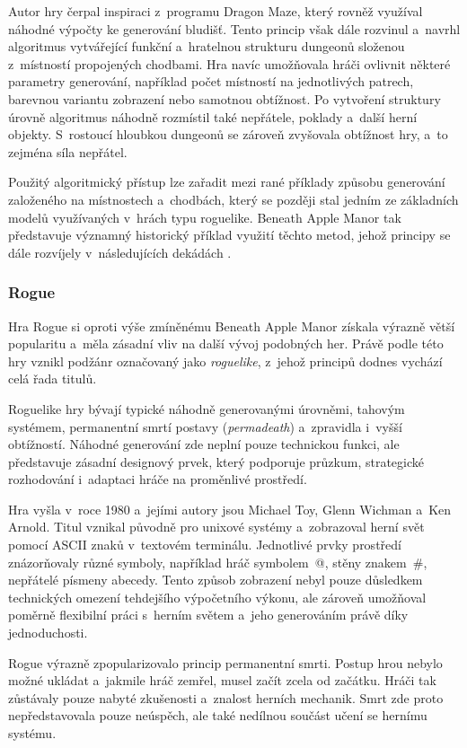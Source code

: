 \documentclass[
   program=itk,
   biblatex,
   figures=true,
   tables=true,
   glossaries,
   index
]{kidiplom}
\begin{document}
Autor hry čerpal inspiraci z~programu Dragon Maze, který rovněž využíval náhodné výpočty ke generování bludišť. Tento princip však dále rozvinul a~navrhl algoritmus vytvářející funkční a~hratelnou strukturu dungeonů složenou z~místností propojených chodbami. Hra navíc umožňovala hráči ovlivnit některé parametry generování, například počet místností na jednotlivých patrech, barevnou variantu zobrazení nebo samotnou obtížnost. Po vytvoření struktury úrovně algoritmus náhodně rozmístil také nepřátele, poklady a~další herní objekty. S~rostoucí hloubkou dungeonů se zároveň zvyšovala obtížnost hry, a~to zejména síla nepřátel.

Použitý algoritmický přístup lze zařadit mezi rané příklady způsobu generování založeného na místnostech a~chodbách, který se později stal jedním ze základních modelů využívaných v~hrách typu roguelike. Beneath Apple Manor tak představuje významný historický příklad využití těchto metod, jehož principy se dále rozvíjely v~následujících dekádách \cite{Schuller_2021,enwiki:1260179812}.

\subsubsection{Rogue}
Hra Rogue si oproti výše zmíněnému Beneath Apple Manor získala výrazně větší popularitu a~měla zásadní vliv na další vývoj podobných her. Právě podle této hry vznikl podžánr označovaný jako \textit{roguelike}, z~jehož principů dodnes vychází celá řada titulů.

Roguelike hry bývají typické náhodně generovanými úrovněmi, tahovým systémem, permanentní smrtí postavy (\textit{permadeath}) a~zpravidla i~vyšší obtížností. Náhodné generování zde neplní pouze technickou funkci, ale představuje zásadní designový prvek, který podporuje průzkum, strategické rozhodování i~adaptaci hráče na proměnlivé prostředí.

Hra vyšla v~roce 1980 a~jejími autory jsou Michael Toy, Glenn Wichman a~Ken Arnold. Titul vznikal původně pro unixové systémy a~zobrazoval herní svět pomocí ASCII znaků v~textovém terminálu. Jednotlivé prvky prostředí znázorňovaly různé symboly, například hráč symbolem~@, stěny znakem~\#, nepřátelé písmeny abecedy. Tento způsob zobrazení nebyl pouze důsledkem technických omezení tehdejšího výpočetního výkonu, ale zároveň umožňoval poměrně flexibilní práci s~herním světem a~jeho generováním právě díky jednoduchosti.

Rogue výrazně zpopularizovalo princip permanentní smrti. Postup hrou nebylo možné ukládat a~jakmile hráč zemřel, musel začít zcela od začátku. Hráči tak zůstávaly pouze nabyté zkušenosti a~znalost herních mechanik. Smrt zde proto nepředstavovala pouze neúspěch, ale také nedílnou součást učení se hernímu systému.
\end{document}
